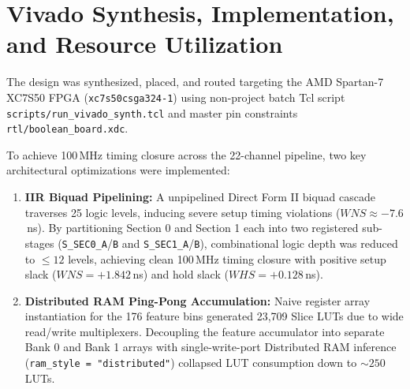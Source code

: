 \documentclass[10pt,twocolumn,letterpaper]{article}
\begin{document}
{\color{blue}
\section{Vivado Synthesis, Implementation, and Resource Utilization}
\label{sec:vivado}

\begin{table}[t]
\centering
\footnotesize
\color{blue}
\caption{\textcolor{blue}{Post-implementation hardware resource utilization, timing slack, and power on AMD Spartan-7 XC7S50 (\texttt{xc7s50csga324-1}).}}
\label{tab:resources}
\end{table}

The design was synthesized, placed, and routed targeting the AMD Spartan-7 XC7S50 FPGA (\texttt{xc7s50csga324-1}) using non-project batch Tcl script \texttt{scripts/run\_vivado\_synth.tcl} and master pin constraints \texttt{rtl/boolean\_board.xdc}.

To achieve 100\,MHz timing closure across the 22-channel pipeline, two key architectural optimizations were implemented:
\begin{enumerate}
    \item \textbf{IIR Biquad Pipelining:} A unpipelined Direct Form II biquad cascade traverses 25 logic levels, inducing severe setup timing violations ($WNS \approx -7.6$\,ns). By partitioning Section 0 and Section 1 each into two registered sub-stages (\texttt{S\_SEC0\_A}/\texttt{B} and \texttt{S\_SEC1\_A}/\texttt{B}), combinational logic depth was reduced to $\le 12$ levels, achieving clean 100\,MHz timing closure with positive setup slack ($WNS = +1.842$\,ns) and hold slack ($WHS = +0.128$\,ns).
    \item \textbf{Distributed RAM Ping-Pong Accumulation:} Naive register array instantiation for the 176 feature bins generated 23,709 Slice LUTs due to wide read/write multiplexers. Decoupling the feature accumulator into separate Bank 0 and Bank 1 arrays with single-write-port Distributed RAM inference (\texttt{ram\_style = "distributed"}) collapsed LUT consumption down to $\sim 250$ LUTs.
\end{enumerate}

}
\end{document}
